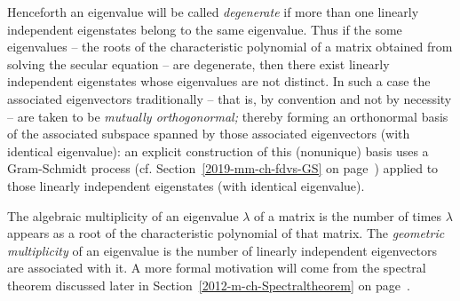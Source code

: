 Henceforth an eigenvalue will be called {\em degenerate} if more
than one linearly independent eigenstates belong to the same eigenvalue.\cite{Praeceptor-1967}
Thus if the some eigenvalues -- the roots of the characteristic
polynomial of a matrix obtained from solving the secular equation
-- are degenerate, then
there exist linearly independent eigenstates whose eigenvalues are not distinct.
In such a case the associated eigenvectors traditionally -- that is, by convention and not by necessity --
are taken to be {\em mutually orthogonormal;} thereby forming an orthonormal basis of the associated subspace
spanned by those associated eigenvectors (with identical eigenvalue):
an explicit construction of this (nonunique) basis
uses a Gram-Schmidt process (cf. Section~\ref{2019-mm-ch-fdvs-GS} on page~\pageref{2019-mm-ch-fdvs-GS})
applied to those linearly independent eigenstates (with identical eigenvalue).

The algebraic multiplicity of an eigenvalue $\lambda$ of a matrix
is the number of times $\lambda$  appears as a root of the characteristic
polynomial of that matrix.
The {\em geometric multiplicity} of an eigenvalue is the number of linearly independent
eigenvectors are associated with it.
A more formal motivation will come from the spectral theorem discussed later in Section~\ref{2012-m-ch-Spectraltheorem}
on page~\pageref{2012-m-ch-Spectraltheorem}.

